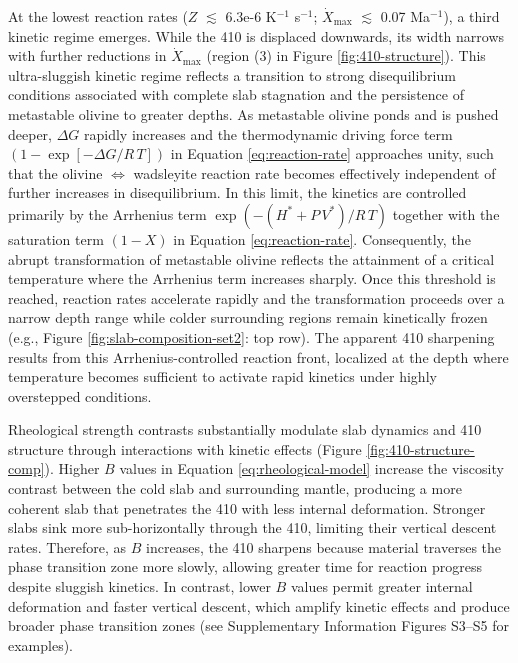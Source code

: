 \documentclass[draft,linenumbers]{agujournal2019}
\begin{document}
At the lowest reaction rates (\(Z\) \(\lesssim\) 6.3e-6 K\(^{-1}\)
s\(^{-1}\); \(\dot{X}_{\mathrm{max}}\) \(\lesssim\) 0.07 Ma\(^{-1}\)), a
third kinetic regime emerges. While the 410 is displaced downwards, its
width narrows with further reductions in \(\dot{X}_{\mathrm{max}}\)
(region (3) in Figure \ref{fig:410-structure}). This ultra-sluggish
kinetic regime reflects a transition to strong disequilibrium conditions
associated with complete slab stagnation and the persistence of
metastable olivine to greater depths. As metastable olivine ponds and is
pushed deeper, \(\Delta G\) rapidly increases and the thermodynamic
driving force term
\(\left(1 - \exp\left[- \Delta G / R\, T \right]\right)\) in Equation
\ref{eq:reaction-rate} approaches unity, such that the olivine
\(\Leftrightarrow\) wadsleyite reaction rate becomes effectively
independent of further increases in disequilibrium. In this limit, the
kinetics are controlled primarily by the Arrhenius term
\(\exp\left(-(H^{\ast} + P\, V^{\ast}) / R\, T\right)\) together with
the saturation term \(\left(1 - X\right)\) in Equation
\ref{eq:reaction-rate}. Consequently, the abrupt transformation of
metastable olivine reflects the attainment of a critical temperature
where the Arrhenius term increases sharply. Once this threshold is
reached, reaction rates accelerate rapidly and the transformation
proceeds over a narrow depth range while colder surrounding regions
remain kinetically frozen (e.g., Figure \ref{fig:slab-composition-set2}:
top row). The apparent 410 sharpening results from this
Arrhenius-controlled reaction front, localized at the depth where
temperature becomes sufficient to activate rapid kinetics under highly
overstepped conditions.

Rheological strength contrasts substantially modulate slab dynamics and
410 structure through interactions with kinetic effects (Figure
\ref{fig:410-structure-comp}). Higher \(B\) values in Equation
\ref{eq:rheological-model} increase the viscosity contrast between the
cold slab and surrounding mantle, producing a more coherent slab that
penetrates the 410 with less internal deformation. Stronger slabs sink
more sub-horizontally through the 410, limiting their vertical descent
rates. Therefore, as \(B\) increases, the 410 sharpens because material
traverses the phase transition zone more slowly, allowing greater time
for reaction progress despite sluggish kinetics. In contrast, lower
\(B\) values permit greater internal deformation and faster vertical
descent, which amplify kinetic effects and produce broader phase
transition zones (see Supplementary Information Figures S3--S5 for
examples).
\end{document}
